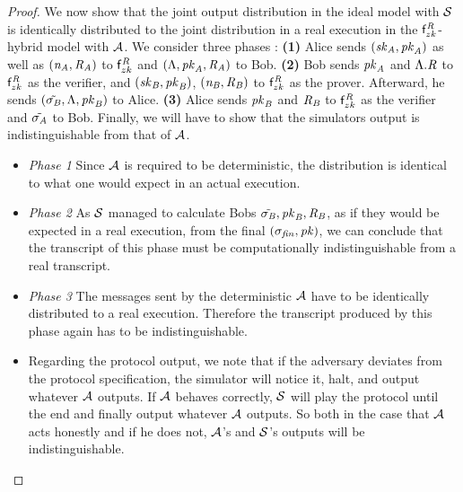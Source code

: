 \begin{proof}
    We now show that the joint output distribution in the ideal model with $\mathcal{S}$ is identically distributed to the joint distribution in a real execution in the $\mathsf{f}^{\mathit{R}}_{zk}$-hybrid model with $\mathcal{A}$.
    We consider three phases :
    \textbf{(1)} Alice sends $(\mathit{sk}_{\mathit{A}}, \mathit{pk}_{\mathit{A}})$ as well as $(\mathit{\mathit{n}_{\mathit{A}}}, \mathit{R}_{\mathit{A}})$ to $\mathsf{f}^{\mathit{R}}_{zk}$ and $(\Lambda, \mathit{pk}_{\mathit{A}}, \mathit{R}_{\mathit{A}})$ to Bob.
    \textbf{(2)} Bob sends $\mathit{pk}_{\mathit{A}}$ and $\Lambda.\mathit{R}$ to $\mathsf{f}^{\mathit{R}}_{zk}$ as the verifier, and  $(\mathit{sk}_{\mathit{B}}, \mathit{pk}_{\mathit{B}})$, $(\mathit{\mathit{n}_{\mathit{B}}}, \mathit{R}_{\mathit{B}})$ to $\mathsf{f}^{\mathit{R}}_{zk}$ as the prover.
    Afterward, he sends $(\tilde{\sigma_{\mathit{B}}}, \Lambda, \mathit{pk}_{\mathit{B}})$ to Alice.
    \textbf{(3)} Alice sends $\mathit{pk}_{\mathit{B}}$ and $\mathit{R}_{\mathit{B}}$ to $\mathsf{f}^{\mathit{R}}_{zk}$ as the verifier and $\tilde{\sigma_{\mathit{A}}}$ to Bob.
    Finally, we will have to show that the simulators output is indistinguishable from that of $\mathcal{A}$.

    \begin{itemize}
        \item \textit{Phase 1} Since $\mathcal{A}$ is required to be deterministic, the distribution is identical to what one would expect in an actual execution.
        \item \textit{Phase 2} As $\mathcal{S}$ managed to calculate Bobs $\tilde{\sigma_{\mathit{B}}}, \mathit{pk}_{\mathit{B}}, \mathit{R}_{\mathit{B}}$, as if they would be expected in a real execution, from the final $(\sigma_{\mathit{fin}}, \mathit{pk})$, we can conclude that the transcript of this phase must be computationally indistinguishable from a real transcript.
        \item \textit{Phase 3} The messages sent by the deterministic $\mathcal{A}$  have to be identically distributed to a real execution.
        Therefore the transcript produced by this phase again has to be indistinguishable.
        \item Regarding the protocol output, we note that if the adversary deviates from the protocol specification, the simulator will notice it, halt, and output whatever $\mathcal{A}$ outputs.
        If $\mathcal{A}$ behaves correctly, $\mathcal{S}$ will play the protocol until the end and finally output whatever $\mathcal{A}$ outputs.
        So both in the case that $\mathcal{A}$ acts honestly and if he does not, $\mathcal{A}$'s and $\mathcal{S}$'s outputs will be indistinguishable.
    \end{itemize}


\end{proof}
